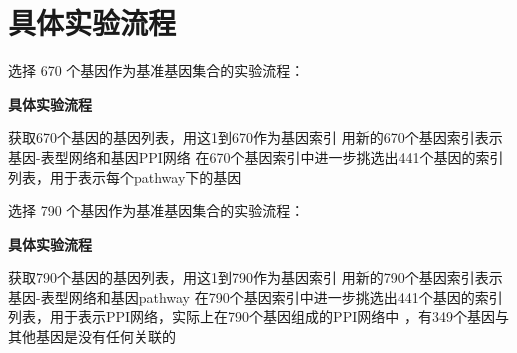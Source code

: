 \documentclass{ctexart}
\begin{document}
\section{具体实验流程}
选择 670 个基因作为基准基因集合的实验流程：
\begin{algorithm}[h]
\caption{\textbf{具体实验流程}}\label{alg:CMNMF}
\renewcommand{\algorithmicrequire}{\textbf{Input:}}
\renewcommand{\algorithmicensure}{\textbf{Output:}}
\label{alg:pf}
\begin{algorithmic}[1]
\STATE 获取670个基因的基因列表，用这1到670作为基因索引
\STATE 用新的670个基因索引表示 基因-表型网络和基因PPI网络
\STATE 在670个基因索引中进一步挑选出441个基因的索引列表，用于表示每个pathway下的基因
\end{algorithmic}
\end{algorithm}

选择 790 个基因作为基准基因集合的实验流程：
\begin{algorithm}[h]
\caption{\textbf{具体实验流程}}\label{alg:CMNMF}
\renewcommand{\algorithmicrequire}{\textbf{Input:}}
\renewcommand{\algorithmicensure}{\textbf{Output:}}
\label{alg:pf}
\begin{algorithmic}[1]
\STATE 获取790个基因的基因列表，用这1到790作为基因索引
\STATE 用新的790个基因索引表示 基因-表型网络和基因pathway
\STATE 在790个基因索引中进一步挑选出441个基因的索引列表，用于表示PPI网络，实际上在790个基因组成的PPI网络中
，有349个基因与其他基因是没有任何关联的
\end{algorithmic}
\end{algorithm}
\end{document}
